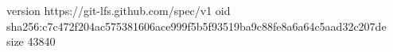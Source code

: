 version https://git-lfs.github.com/spec/v1
oid sha256:c7c472f204ac575381606ace999f5b5f93519ba9c88fe8a6a64c5aad32c207de
size 43840
